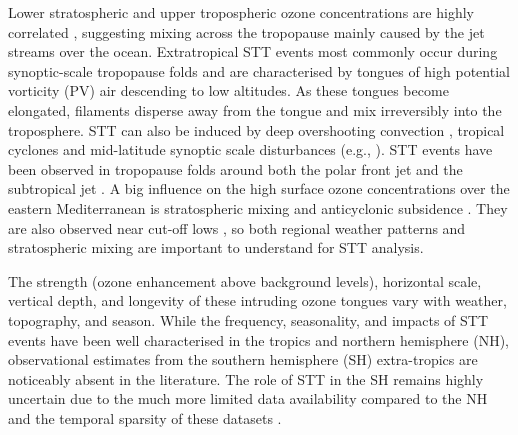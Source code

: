 \documentclass[acp, manuscript]{copernicus} %
\begin{document}
  Lower stratospheric and upper tropospheric ozone concentrations are highly correlated \citep{Terao2008}, suggesting mixing across the tropopause mainly caused by the jet streams over the ocean.
  Extratropical STT events most commonly occur during synoptic-scale tropopause folds \citep{Sprenger2003, Tang2012, Frey2015} and are characterised by tongues of high potential vorticity (PV) air descending to low altitudes.
  As these tongues become elongated, filaments disperse away from the tongue and mix irreversibly into the troposphere.
  STT can also be induced by deep overshooting convection \citep{Frey2015}, tropical cyclones \citep{Das2016} and mid-latitude synoptic scale disturbances (e.g., \citet{Stohl2003, Mihalikova2012}). 
  STT events have been observed in tropopause folds around both the polar front jet \citep{Vaughan1994, Beekmann1997} and the subtropical jet \citep{Baray2000}.
  A big influence on the high surface ozone concentrations over the eastern Mediterranean is stratospheric mixing and anticyclonic subsidence \citep{Zanis2014}. 
  They are also observed near cut-off lows \citep{Price1993, Wirth1995}, so both regional weather patterns and stratospheric mixing are important to understand for STT analysis.

  The strength (ozone enhancement above background levels), horizontal scale, vertical depth, and longevity of these intruding ozone tongues vary with weather, topography, and season.
  While the frequency, seasonality, and impacts of STT events have been well characterised in the tropics and northern hemisphere (NH), observational estimates from the southern hemisphere (SH) extra-tropics are noticeably absent in the literature. 
  The role of STT in the SH remains highly uncertain due to the much more limited data availability compared to the NH and the temporal sparsity of these datasets \citep{Mze2010, Thompson2014, Liu2015}. 
\end{document}
